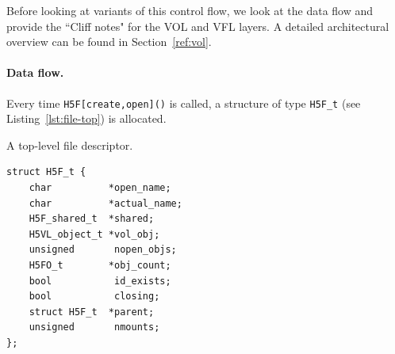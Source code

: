 Before looking at variants of this control flow, we look at the data flow and provide the ``Cliff notes" for the VOL and VFL layers. A detailed architectural overview can be found in Section~\ref{ref:vol}.

\paragraph{Data flow.} Every time \texttt{H5F[create,open]()} is called, a structure of type \texttt{H5F\_t} (see Listing~\ref{lst:file-top}) is allocated.

\begin{listing}
\centering
\caption{A top-level file descriptor.}
\label{lst:file-top}
\begin{verbatim}
struct H5F_t {
    char          *open_name;
    char          *actual_name;
    H5F_shared_t  *shared;
    H5VL_object_t *vol_obj;
    unsigned       nopen_objs;
    H5FO_t        *obj_count;
    bool           id_exists;
    bool           closing;
    struct H5F_t  *parent;
    unsigned       nmounts;
};
\end{verbatim}
\end{listing}

